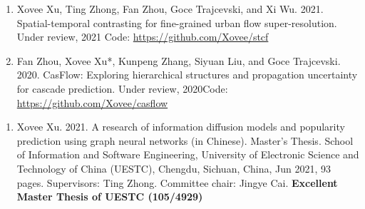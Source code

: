 
\begin{enumerate}[resume]
    \item Xovee Xu, Ting Zhong, Fan Zhou, Goce Trajcevski, and Xi Wu. 2021. Spatial-temporal contrasting for fine-grained urban flow super-resolution. Under review, 2021 \newline Code: {\color{gray}\url{https://github.com/Xovee/stcf}}
    \item Fan Zhou, Xovee Xu*, Kunpeng Zhang, Siyuan Liu, and Goce Trajcevski. 2020. CasFlow: Exploring hierarchical structures and propagation uncertainty for cascade prediction. Under review, 2020\newline Code: {\color{gray}\url{https://github.com/Xovee/casflow}}
\end{enumerate}


\begin{enumerate}
    \item Xovee Xu. 2021. A research of information diffusion models and popularity prediction using graph neural networks (in Chinese). Master's Thesis. School of Information and Software Engineering, University of Electronic Science and Technology of China (UESTC), Chengdu, Sichuan, China, Jun 2021, 93 pages. Supervisors: Ting Zhong. Committee chair: Jingye Cai. \newline
    \textbf{\color{red}Excellent Master Thesis of UESTC (105/4929)}
\end{enumerate}